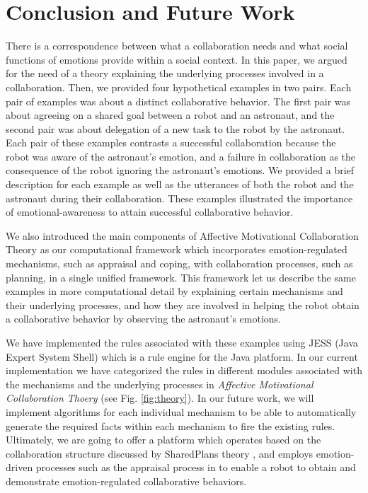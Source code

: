 \section{Conclusion and Future Work}

There is a correspondence between what a collaboration needs and what social
functions of emotions provide within a social context. In this paper, we argued
for the need of a theory explaining the underlying processes involved in a
collaboration. Then, we provided four hypothetical examples in two pairs. Each
pair of examples was about a distinct collaborative behavior. The first pair was
about agreeing on a shared goal between a robot and an astronaut, and the second
pair was about delegation of a new task to the robot by the astronaut. Each pair
of these examples contrasts a successful collaboration because the robot was
aware of the astronaut's emotion, and a failure in collaboration as the
consequence of the robot ignoring the astronaut's emotions. We provided a brief
description for each example as well as the utterances of both the robot and the
astronaut during their collaboration. These examples illustrated the importance
of emotional-awareness to attain successful collaborative behavior.

We also introduced the main components of Affective Motivational Collaboration
Theory as our computational framework which incorporates emotion-regulated
mechanisms, such as appraisal and coping, with collaboration processes, such as
planning, in a single unified framework. This framework let us describe the same
examples in more computational detail by explaining certain mechanisms and their
underlying processes, and how they are involved in helping the robot obtain a
collaborative behavior by observing the astronaut's emotions.

We have implemented the rules associated with these examples using JESS (Java
Expert System Shell) which is a rule engine for the Java platform. In our
current implementation we have categorized the rules in different modules
associated with the mechanisms and the underlying processes in \textit{Affective
Motivational Collaboration Thoery} (see Fig. \ref{fig:theory}). In our future
work, we will implement algorithms for each individual mechanism to be able to
automatically generate the required facts within each mechanism to fire the
existing rules. Ultimately, we are going to offer a platform which operates
based on the collaboration structure discussed by SharedPlans theory
\cite{grosz:discourse-structure}, and employs emotion-driven processes such as
the appraisal process in \cite{marsella:ema-process-model} to enable a robot to
obtain and demonstrate emotion-regulated collaborative behaviors.

